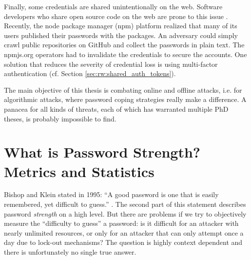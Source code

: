Finally, some credentials are shared unintentionally on the web. Software developers who share open source code on the web are prone to this issue \cite{Conklin2004PWAuthenticationSystemPerspective}. Recently, the node package manager (npm) platform realized that many of its users published their passwords with the packages. An adversary could simply crawl public repositories on GitHub and collect the passwords in plain text. The npmjs.org operators had to invalidate the credentials to secure the accounts. One solution that reduces the severity of credential loss is using multi-factor authentication (cf. Section \ref{sec:rw:shared_auth_tokens}).






The main objective of this thesis is combating online and offline attacks, i.e. for algorithmic attacks, where password coping strategies really make a difference. A panacea for all kinds of threats, each of which has warranted multiple PhD theses, is probably impossible to find. 



\section{What is Password Strength? Metrics and Statistics}\label{sec:rw:pw_strength_metrics}
Bishop and Klein stated in 1995: ``A good password is one that is easily remembered, yet difficult to guess.'' \cite[p. 231]{Bishop1995ProactivePasswordChecking}. The second part of this statement describes password \textit{strength} on a high level. But there are problems if we try to objectively measure the ``difficulty to guess'' a password: is it difficult for an attacker with nearly unlimited resources, or only for an attacker that can only attempt once a day due to lock-out mechanisms? The question is highly context dependent and there is unfortunately no single true answer. 


